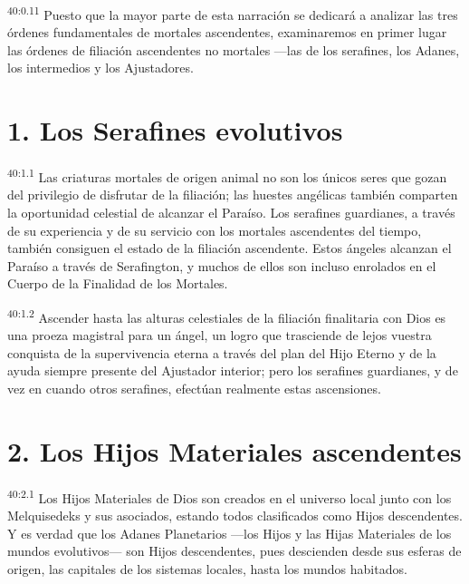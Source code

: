 \par
\textsuperscript{40:0.11} Puesto que la mayor parte de esta narración se dedicará a analizar las tres órdenes fundamentales de mortales ascendentes, examinaremos en primer lugar las órdenes de filiación ascendentes no mortales ---las de los serafines, los Adanes, los intermedios y los Ajustadores.

\section*{1. Los Serafines evolutivos}
\par
\textsuperscript{40:1.1} Las criaturas mortales de origen animal no son los únicos seres que gozan del privilegio de disfrutar de la filiación; las huestes angélicas también comparten la oportunidad celestial de alcanzar el Paraíso. Los serafines guardianes, a través de su experiencia y de su servicio con los mortales ascendentes del tiempo, también consiguen el estado de la filiación ascendente. Estos ángeles alcanzan el Paraíso a través de Serafington, y muchos de ellos son incluso enrolados en el Cuerpo de la Finalidad de los Mortales.

\par
\textsuperscript{40:1.2} Ascender hasta las alturas celestiales de la filiación finalitaria con Dios es una proeza magistral para un ángel, un logro que trasciende de lejos vuestra conquista de la supervivencia eterna a través del plan del Hijo Eterno y de la ayuda siempre presente del Ajustador interior; pero los serafines guardianes, y de vez en cuando otros serafines, efectúan realmente estas ascensiones.

\section*{2. Los Hijos Materiales ascendentes}
\par
\textsuperscript{40:2.1} Los Hijos Materiales de Dios son creados en el universo local junto con los Melquisedeks y sus asociados, estando todos clasificados como Hijos descendentes. Y es verdad que los Adanes Planetarios ---los Hijos y las Hijas Materiales de los mundos evolutivos--- son Hijos descendentes, pues descienden desde sus esferas de origen, las capitales de los sistemas locales, hasta los mundos habitados.

